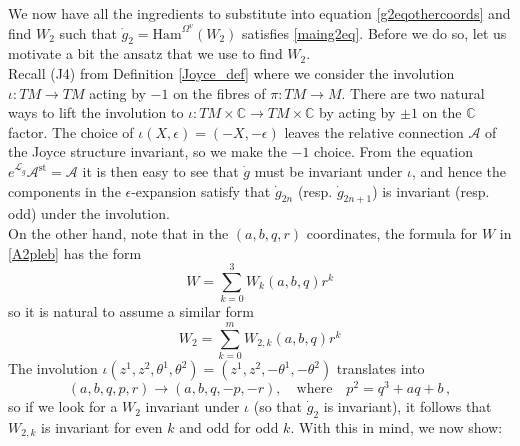 \documentclass{article}
\theoremstyle{definition}
\numberwithin{equation}{section}
\begin{document}
We now have all the ingredients to substitute into equation \eqref{g2eqothercoords} and find $W_2$ such that $\dot{g}_2=\text{Ham}^{\Omega^{v}}(W_2)$ satisfies \eqref{maing2eq}. Before we do so, let us motivate a bit the ansatz that we use to find $W_2$.\\

Recall (J4) from Definition \ref{Joyce_def} where we consider the involution $\iota:TM\to TM$ acting by $-1$ on the fibres of $\pi:TM\to M$. There are two natural ways to lift the involution to $\iota:TM\times \mathbb{C}\to TM\times \mathbb{C}$ by acting by $\pm 1$ on the $\mathbb{C}$ factor. The choice of $\iota(X,\epsilon)=(-X,-\epsilon)$ leaves the relative connection $\mathcal{A}$ of the Joyce structure invariant, so we make the $-1$ choice. From the equation $e^{\mathcal{L}_{\dot{g}}}\mathcal{A}^{\text{st}}=\mathcal{A}$ it is then easy to see that $\dot{g}$ must be invariant under $\iota$, and hence the components in the $\epsilon$-expansion satisfy that  $\dot{g}_{2n}$ (resp. $\dot{g}_{2n+1}$) is invariant (resp. odd) under the involution.\\

On the other hand, note that in the $(a,b,q,r)$ coordinates, the formula for $W$ in \eqref{A2pleb} has the form
\begin{equation*}
    W=\sum_{k=0}^{3}W_{k}(a,b,q)r^k
\end{equation*}
so it is natural to assume a similar form 
\begin{equation*}
    W_2=\sum_{k=0}^mW_{2,k}(a,b,q)r^k
\end{equation*}
The involution $\iota(z^1,z^2,\theta^1,\theta^2)=(z^1,z^2,-\theta^1,-\theta^2)$ translates into \cite[Remark 3.5]{BridgelandOsc}
\begin{equation*}
    (a,b,q,p,r)\to (a,b,q,-p,-r), \quad \text{where} \quad p^2=q^3+aq+b\,,
\end{equation*}
so if we look for a $W_2$ invariant under $\iota$ (so that $\dot{g}_2$ is invariant), it follows that $W_{2,k}$ is invariant for even $k$ and odd for odd $k$. With this in mind, we now show:
\end{document}
